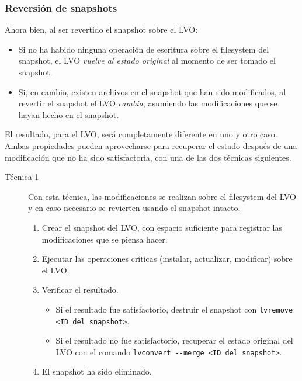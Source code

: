 \subsubsection{Reversión de snapshots}
Ahora bien, al ser revertido el snapshot sobre el LVO:
\begin{itemize}
	\item Si no ha habido ninguna operación de escritura sobre el filesystem del snapshot, el LVO \emph{vuelve al estado original} al momento de ser tomado el snapshot. 
	\item Si, en cambio, existen archivos en el snapshot que han sido modificados, al revertir el snapshot el LVO \emph{cambia}, asumiendo las modificaciones que se hayan hecho en el snapshot. 
\end{itemize}

El resultado, para el LVO, será completamente diferente en uno y otro caso. Ambas propiedades pueden aprovecharse para recuperar el estado después de una modificación que no ha sido satisfactoria, con una de las dos técnicas siguientes.


\begin{description}
\item [Técnica 1] Con esta técnica, las modificaciones se realizan sobre el filesystem del LVO y en caso necesario se revierten usando el snapshot intacto. 
\begin{enumerate}
	\item Crear el snapshot del LVO, con espacio suficiente para registrar las modificaciones que se piensa hacer.
	\item Ejecutar las operaciones críticas (instalar, actualizar, modificar) sobre el LVO.
	\item Verificar el resultado.
	\begin{itemize}
		\item Si el resultado fue satisfactorio, destruir el snapshot con \lstinline$lvremove <ID del snapshot>$. 
		\item Si el resultado no fue satisfactorio, recuperar el estado original del LVO con el comando \lstinline$lvconvert --merge <ID del snapshot>$.
	\end{itemize}
	\item El snapshot ha sido eliminado.
\end{enumerate}
\end{description}

